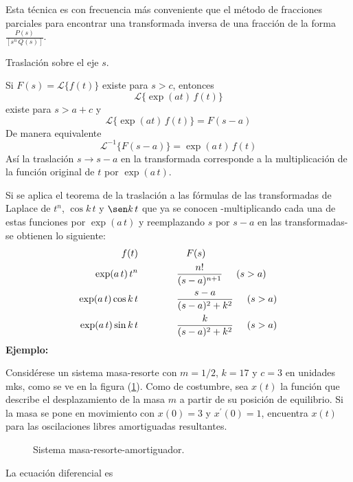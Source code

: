 Esta técnica es con frecuencia más conveniente que el método de fracciones parciales para encontrar una transformada inversa de una fracción de la forma $\displaystyle \frac{P(s)}{[s^{n} \, Q(s)]}$.
\begin{teo}{Traslación sobre el eje $s$.}

Si $F(s) = \mathscr{L} \{ f(t) \}$ existe para $s > c$, entonces  
\[ \mathscr{L} \{\exp(at) \, f(t) \} \]
existe para $s > a + c$ y
\[ \mathscr{L} \{ \exp(at) \, f(t) \} = F(s - a) \]
De manera equivalente
\[ \mathscr{L}^{-1} \{ F(s - a) \} = \exp(a \, t) \, f(t) \]
Así la traslación $s \to s - a$ en la transformada corresponde a la multiplicación de la función original de $t$ por $\exp(a \, t)$.
\end{teo}
Si se aplica el teorema de la traslación a las fórmulas de las transformadas de Laplace de $t^{n}$, $\cos k \, t$ y $\sen k \, t$ que ya se conocen  -multiplicando cada una de estas funciones por $\exp(a \, t)$ y reemplazando $s$ por $s - a$ en las transformadas- se obtienen lo siguiente:
\begin{align}
f(t) & \quad \quad \quad \quad \quad F(s) \nonumber \\
\exp(a \, t) \, t^{n} & \quad \quad \quad \quad \dfrac{n!}{(s-a)^{n+1}} \hspace{0.5cm} (s > a)  \label{eq:ecuacion_07_03_06} \\
\exp(a \, t) \cos k \, t & \quad \quad \quad \quad \dfrac{s-a}{(s-a)^{2}+ k^{2}} \hspace{0.5cm} (s > a)  \label{eq:ecuacion_07_03_07}\\
\exp(a \, t) \sin k \, t & \quad \quad \quad \quad \dfrac{k}{(s-a)^{2} + k^{2}} \hspace{0.5cm} (s > a)  \label{eq:ecuacion_07_03_08}
\end{align}
\textbf{Ejemplo:}
\par
Considérese un sistema masa-resorte con $m = 1/2$, $k = 17$ y $c = 3$ en unidades mks, como se ve en la figura (\ref{fig:figura_07_03_01}). Como de costumbre, sea $x(t)$ la función que describe el desplazamiento de la masa $m$ a partir de su posición de equilibrio. Si la masa se pone en movimiento con $x(0)= 3$ y $x^{\prime}(0) = 1$, encuentra $x(t)$ para las oscilaciones libres amortiguadas resultantes.
\begin{figure}[H]
    \centering
    
    \caption{Sistema masa-resorte-amortiguador.}
    \label{fig:figura_07_03_01}
\end{figure}
La ecuación diferencial es
